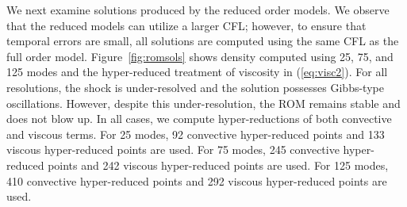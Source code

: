 \documentclass[review]{siamart171218}
\theoremstyle{assumption}
\begin{document}
We next examine solutions produced by the reduced order models.  We observe that the reduced models can utilize a larger CFL; however, to ensure that temporal errors are small, all solutions are computed using the same CFL as the full order model.  Figure~\ref{fig:romsols} shows density computed using 25, 75, and 125 modes and the hyper-reduced treatment of viscosity in (\ref{eq:visc2}).  For all resolutions, the shock is under-resolved and the solution possesses Gibbs-type oscillations.  However, despite this under-resolution, the ROM remains stable and does not blow up.  In all cases, we compute hyper-reductions of both convective and viscous terms.  For 25 modes, 92 convective hyper-reduced points and 133 viscous hyper-reduced points are used.  For 75 modes, 245 convective hyper-reduced points and 242 viscous hyper-reduced points are used.  For 125 modes, 410 convective hyper-reduced points and 292 viscous hyper-reduced points are used.  
\end{document}
